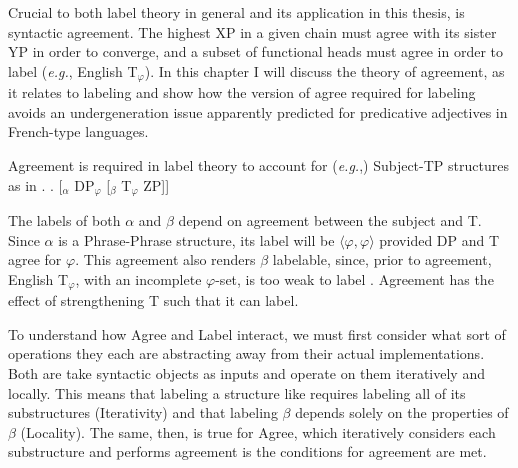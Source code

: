 \documentclass[MilwayThesis]{subfiles}
\begin{document}
Crucial to both label theory in general and its application in this thesis, is syntactic agreement.
The highest XP in a given chain must agree with its sister YP in order to converge, and a subset of functional heads must agree in order to label (\textit{e.g.}, English T$_\varphi$).
In this chapter I will discuss the theory of agreement, as it relates to labeling and show how the version of agree required for labeling avoids an undergeneration issue apparently predicted for predicative adjectives in French-type languages.

Agreement is required in label theory to account for (\textit{e.g.},) Subject-TP structures as in \Next.
\ex. [$_\alpha$ DP$_\varphi$ [$_\beta$ T$_\varphi$ ZP]]

The labels of both $\alpha$ and $\beta$ depend on agreement between the subject and T.
Since $\alpha$ is a Phrase-Phrase structure, its label will be $\langle\varphi,\varphi\rangle$ provided DP and T agree for $\varphi$.
This agreement also renders $\beta$ labelable, since, prior to agreement, English T$_\varphi$, with an incomplete $\varphi$-set, is too weak to label \parencite{chomsky2013problems}.
Agreement has the effect of strengthening T such that it can label.

To understand how Agree and Label interact, we must first consider what sort of operations they each are abstracting away from their actual implementations.
Both are take syntactic objects as inputs and operate on them iteratively and locally.
This means that labeling a structure like \Last requires labeling all of its substructures (Iterativity) and that labeling $\beta$ depends solely on the properties of $\beta$ (Locality).
The same, then, is true for Agree, which iteratively considers each substructure and performs agreement is the conditions for agreement are met.
\end{document}
